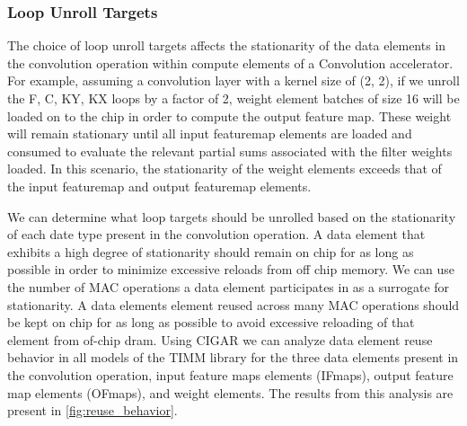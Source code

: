 \subsubsection{Loop Unroll Targets}
\label{chap:dda:dataflow_dse:pruning:applying_it:loop_unroll_targets}

The choice of loop unroll targets affects the stationarity of the data elements
in the convolution operation within compute elements of a Convolution
accelerator. For example, assuming a convolution layer with a
kernel size of (2, 2), if we unroll the F, C, KY, KX loops by a factor of 2,
weight element batches of size 16 will be loaded on to the chip in order to
compute the output feature map. These weight will remain stationary until all
input featuremap elements are loaded and consumed to evaluate the relevant
partial sums associated with the filter weights loaded. In this scenario, the
stationarity of the weight elements exceeds that of the input featuremap and
output featuremap elements.   


We can determine what loop targets should be unrolled based on the
stationarity of each date type present in the convolution operation. A data
element that exhibits a high degree of stationarity should remain on chip for as
long as possible in order to minimize excessive reloads from off chip memory. We
can use the number of MAC operations a data element participates in as a
surrogate for stationarity. A data elements element reused across many MAC operations
should be kept on chip for as long as possible to avoid excessive reloading of
that element from of-chip dram. Using CIGAR we can analyze data element reuse
behavior in all models of the TIMM library for the three data elements present in the convolution operation, input
feature maps elements (IFmaps), output feature map elements (OFmaps), and weight
elements. The results from this analysis are present in
\autoref{fig:reuse_behavior}. 

